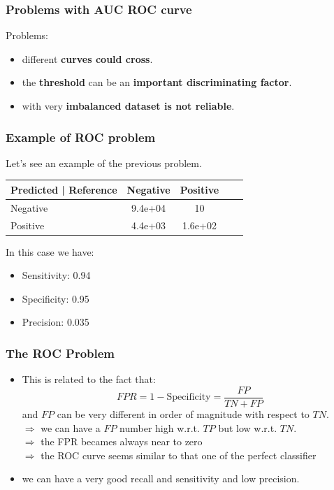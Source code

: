 \documentclass[9pt]{beamer}
\begin{document}
\begin{frame}
\frametitle{Problems with AUC ROC curve}
Problems:
\begin{itemize}
\item<1 -> different \textbf{curves could cross}.
\item<2 -> the \textbf{threshold} can be an \textbf{important discriminating factor}.
\item<3 -> with very \textbf{imbalanced dataset is not reliable}.
\end{itemize}
\end{frame}
\begin{frame}
\frametitle{Example of ROC problem}
Let's see an example of the previous problem.\\
\begin{table}
\begin{tabular}{l | c | c | c | c }
Predicted | Reference & Negative & Positive \\
\hline \hline
Negative & 9.4e+04 & 10 \\ 
Positive &  4.4e+03 & 1.6e+02 \\
\end{tabular}
\end{table}
In this case we have:
\begin{itemize}
\item Sensitivity: 0.94
\item Specificity: 0.95
\item Precision: 0.035
\end{itemize}
\end{frame}


\begin{frame}
\frametitle{The ROC Problem}
\begin{itemize}
\item This is related to the fact that:
$$
FPR = 1 - \mbox{Specificity}= \dfrac{FP}{TN + FP}
$$
and $FP$ can be very different in order of magnitude with respect to $TN$. \\
$\Rightarrow$ we can have a $FP$ number high w.r.t. $TP$ but low w.r.t. $TN$. \\
$\Rightarrow$ the FPR becames always near to zero\\
$\Rightarrow$ the ROC curve seems similar to that one of the perfect classifier\\
\item we can have a very good recall and sensitivity and low precision.
\end{itemize}
\end{frame}
\end{document}
